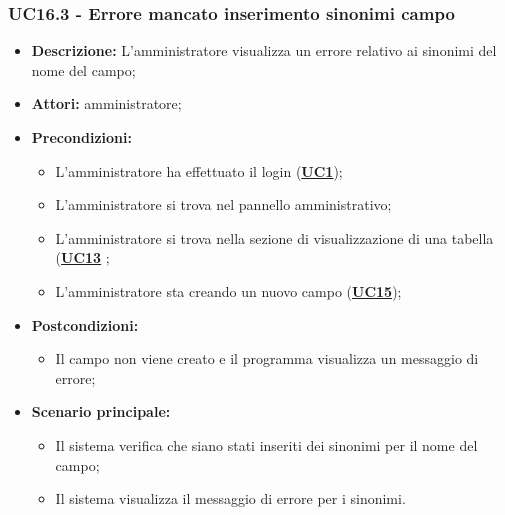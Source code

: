 \subsubsection{UC16.3 - Errore mancato inserimento sinonimi campo}
\label{sec:UC16.3}
\begin{itemize}
	\item \textbf{Descrizione:} L’amministratore visualizza un errore relativo ai sinonimi del nome del campo;
	\item \textbf{Attori:} amministratore;
	\item \textbf{Precondizioni:} 
	\begin{itemize}
		\item L’amministratore ha effettuato il login (\hyperref[sec:UC1]{\textbf{UC1}});
		\item L’amministratore si trova nel pannello amministrativo;
		\item L’amministratore si trova nella sezione di visualizzazione di una tabella (\hyperref[sec:UC13]{\textbf{UC13}} ;
		\item L’amministratore sta creando un nuovo campo (\hyperref[sec:UC15]{\textbf{UC15}});
	\end{itemize}
	\item \textbf{Postcondizioni:} 
	\begin{itemize}
		\item Il campo non viene creato e il programma visualizza un messaggio di errore;
	\end{itemize}
	\item \textbf{Scenario principale:} 
	\begin{itemize}
		\item Il sistema verifica che siano stati inseriti dei sinonimi per il nome del campo;
		\item Il sistema visualizza il messaggio di errore per i sinonimi.
	\end{itemize}
\end{itemize}

